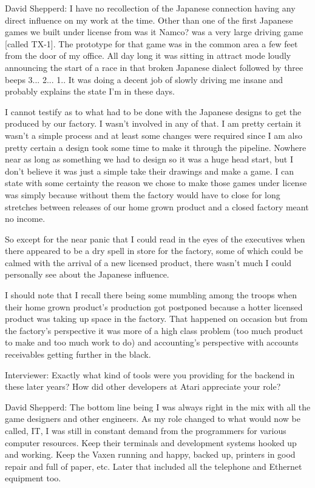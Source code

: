 \textcolor{interviewee}{David Shepperd:} I have no recollection of the Japanese connection having any direct influence on my work at the time. Other than one of the first Japanese games we built under license from was it Namco? was a very large driving game [called TX-1]. The prototype for that game was in the common area a few feet from the door of my office. All day long it was sitting in attract mode loudly announcing the start of a race in that broken Japanese dialect followed by three beeps 3... 2... 1.. It was doing a decent job of slowly driving me insane and probably explains the state I'm in these days.

I cannot testify as to what had to be done with the Japanese designs to get the produced by our factory. I wasn't involved in any of that. I am pretty certain it wasn't a simple process and at least some changes were required since I am also pretty certain a design took some time to make it through the pipeline. Nowhere near as long as something we had to design so it was a huge head start, but I don't believe it was just a simple take their drawings and make a game. I can state with some certainty the reason we chose to make those games under license was simply because without them the factory would have to close for long stretches between releases of our home grown product and a closed factory meant no income.

So except for the near panic that I could read in the eyes of the executives when there appeared to be a dry spell in store for the factory, some of which could be calmed with the arrival of a new licensed product, there wasn't much I could personally see about the Japanese influence. 

I should note that I recall there being some mumbling among the troops when their home grown product's production got postponed because a hotter licensed product was taking up space in the factory. That happened on occasion but from the factory's perspective it was more of a high class problem (too much product to make and too much work to do) and accounting's perspective with accounts receivables getting further in the black. 

\textcolor{interviewer}{Interviewer:} Exactly what kind of tools were you providing for the backend in these later years? How did other developers at Atari appreciate your role?

\textcolor{interviewee}{David Shepperd:} The bottom line being I was always right in the mix with all the game designers and other engineers. As my role changed to what would now be called, IT, I was still in constant demand from the programmers for various computer resources. Keep their terminals and development systems hooked up and working. Keep the Vaxen running and happy, backed up, printers in good repair and full of paper, etc. Later that included all the telephone and Ethernet equipment too. 

